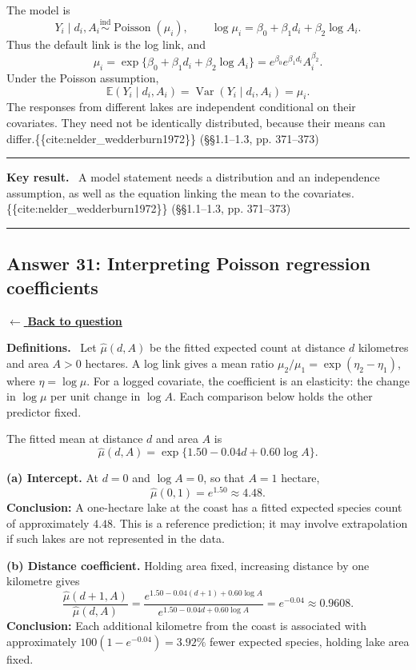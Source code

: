 \documentclass[11pt,a4paper]{article}
\newcommand{\given}{\mathrel{|}}
\newcommand{\E}{\mathbb{E}}
\newcommand{\answernav}[1]{%
  \label{answer:#1}%
  \noindent\hyperref[question:#1]{$\leftarrow$ \textbf{Back to question}}%
  \par\smallskip}
\newcommand{\studyheading}[1]{%
  \par\medskip\noindent\textcolor{statblue}{\textbf{#1.}}\ }
\newenvironment{keyresult}
  {\begin{center}\begin{minipage}{0.92\linewidth}\color{statblue}%
   \hrule\vspace{6pt}\textbf{Key result.}\ }
  {\vspace{6pt}\hrule\end{minipage}\end{center}}
\begin{document}
The model is
\[
\boxed{
Y_i\given d_i,A_i\overset{\mathrm{ind}}{\sim}
\operatorname{Poisson}(\mu_i),
\qquad
\log\mu_i=\beta_0+\beta_1d_i+\beta_2\log A_i.
}
\]
Thus the default link is the log link, and
\[
\mu_i=\exp\{\beta_0+\beta_1d_i+\beta_2\log A_i\}
     =e^{\beta_0}e^{\beta_1d_i}A_i^{\beta_2}.
\]
Under the Poisson assumption,
\[
\E(Y_i\given d_i,A_i)
=\operatorname{Var}(Y_i\given d_i,A_i)=\mu_i.
\]
The responses from different lakes are independent conditional on their
covariates. They need not be identically distributed, because their means
can differ.\{\{cite:nelder_wedderburn1972\}\} (§§1.1–1.3, pp. 371–373)

\begin{keyresult}
A model statement needs a distribution and an independence assumption,
as well as the equation linking the mean to the covariates.\{\{cite:nelder_wedderburn1972\}\} (§§1.1–1.3, pp. 371–373)
\end{keyresult}

\clearpage

\subsection{Answer 31: Interpreting Poisson regression coefficients}
\answernav{31}

\studyheading{Definitions}
Let $\widehat\mu(d,A)$ be the fitted expected count at distance $d$ kilometres and area $A>0$ hectares.
A log link gives a mean ratio $\mu_2/\mu_1=\exp(\eta_2-\eta_1)$, where $\eta=\log\mu$.
For a logged covariate, the coefficient is an elasticity: the change in $\log\mu$ per unit change in $\log A$.
Each comparison below holds the other predictor fixed.

The fitted mean at distance $d$ and area $A$ is
\[
\widehat\mu(d,A)=\exp\{1.50-0.04d+0.60\log A\}.
\]

\textbf{(a) Intercept.}
At $d=0$ and $\log A=0$, so that $A=1$ hectare,
\[
\widehat\mu(0,1)=e^{1.50}\approx4.48.
\]
\textbf{Conclusion:} A one-hectare lake at the coast has a fitted expected
species count of approximately $4.48$. This is a reference prediction;
it may involve extrapolation if such lakes are not represented in the data.

\textbf{(b) Distance coefficient.}
Holding area fixed, increasing distance by one kilometre gives
\[
\frac{\widehat\mu(d+1,A)}{\widehat\mu(d,A)}
=\frac{e^{1.50-0.04(d+1)+0.60\log A}}
       {e^{1.50-0.04d+0.60\log A}}
=e^{-0.04}\approx0.9608.
\]
\textbf{Conclusion:} Each additional kilometre from the coast is associated
with approximately $100(1-e^{-0.04})=3.92\%$ fewer expected species,
holding lake area fixed.
\end{document}
